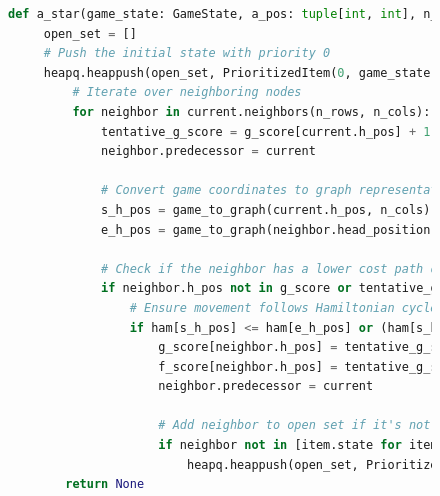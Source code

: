 \begin{figure}[H]
    \centering
    \begin{lstlisting}[language=python, style=python, caption={Modifikovaný A*}, label={lst:a_star_modification}, mathescape=true]
    def a_star(game_state: GameState, a_pos: tuple[int, int], n_rows: int, n_cols: int, ham):
     open_set = []
     # Push the initial state with priority 0
     heapq.heappush(open_set, PrioritizedItem(0, game_state))
         # Iterate over neighboring nodes
         for neighbor in current.neighbors(n_rows, n_cols):
             tentative_g_score = g_score[current.h_pos] + 1
             neighbor.predecessor = current

             # Convert game coordinates to graph representation
             s_h_pos = game_to_graph(current.h_pos, n_cols)
             e_h_pos = game_to_graph(neighbor.head_position, n_cols)
             
             # Check if the neighbor has a lower cost path or is unvisited
             if neighbor.h_pos not in g_score or tentative_g_score < g_score[neighbor.h_pos]:
                 # Ensure movement follows Hamiltonian cycle constraints
                 if ham[s_h_pos] <= ham[e_h_pos] or (ham[s_h_pos] == (n_cols * n_cols)-1 and ham[e_h_pos] == 0):
                     g_score[neighbor.h_pos] = tentative_g_score
                     f_score[neighbor.h_pos] = tentative_g_score + heuristic(neighbor.h_pos,a_pos)
                     neighbor.predecessor = current
                     
                     # Add neighbor to open set if it's not already included
                     if neighbor not in [item.state for item in open_set]:
                         heapq.heappush(open_set, PrioritizedItem(f_score[neighbor.h_pos], neighbor))
        return None
    \end{lstlisting}
\end{figure}